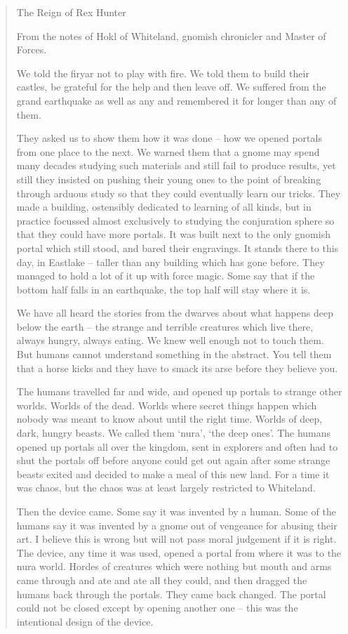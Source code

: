 \begin{quotation}
	
The Reign of Rex Hunter

From the notes of Hokl of Whiteland, gnomish chronicler and Master of Forces.

We told the firyar not to play with fire.  We told them to build their castles, be grateful for the help and then leave off.  We suffered from the grand earthquake as well as any and remembered it for longer than any of them.  

	They asked us to show them how it was done -- how we opened portals from one place to the next.  We warned them that a gnome may spend many decades studying such materials and still fail to produce results, yet still they insisted on pushing their young ones to the point of breaking through arduous study so that they could eventually learn our tricks.  They made a building, ostensibly dedicated to learning of all kinds, but in practice focussed almost exclusively to studying the conjuration sphere so that they could have more portals.  It was built next to the only gnomish portal which still stood, and bared their engravings.  It stands there to this day, in Eastlake -- taller than any building which has gone before.  They managed to hold a lot of it up with force magic.  Some say that if the bottom half falls in an earthquake, the top half will stay where it is.

	We have all heard the stories from the dwarves about what happens deep below the earth -- the strange and terrible creatures which live there, always hungry, always eating.  We knew well enough not to touch them.  But humans cannot understand something in the abstract.  You tell them that a horse kicks and they have to smack its arse before they believe you.

	The humans travelled far and wide, and opened up portals to strange other worlds.  Worlds of the dead.  Worlds where secret things happen which nobody was meant to know about until the right time.  Worlds of deep, dark, hungry beasts.  We called them `nura', `the deep ones'.  The humans opened up portals all over the kingdom, sent in explorers and often had to shut the portals off before anyone could get out again after some strange beasts exited and decided to make a meal of this new land.  For a time it was chaos, but the chaos was at least largely restricted to Whiteland.

	Then the device came.  Some say it was invented by a human.  Some of the humans say it was invented by a gnome out of vengeance for abusing their art.  I believe this is wrong but will not pass moral judgement if it is right.  The device, any time it was used, opened a portal from where it was to the nura world.  Hordes of creatures which were nothing but mouth and arms came through and ate and ate all they could, and then dragged the humans back through the portals.  They came back changed.  The portal could not be closed except by opening another one -- this was the intentional design of the device.


\end{quotation}
